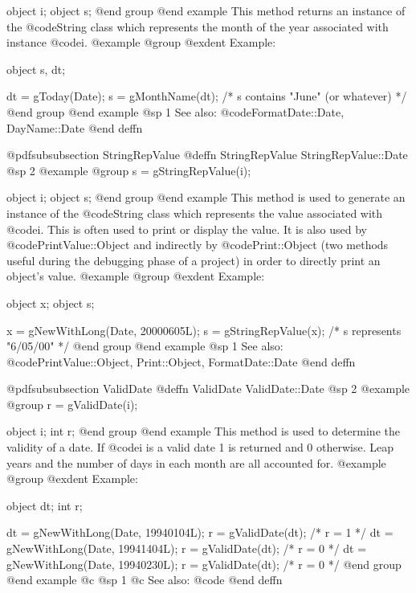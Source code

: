 object  i;
object  s;
@end group
@end example
This method returns an instance of the @code{String} class which represents
the month of the year associated with instance @code{i}.
@example
@group
@exdent Example:

object  s, dt;

dt = gToday(Date);
s = gMonthName(dt);   /*  s contains "June" (or whatever)  */
@end group
@end example
@sp 1
See also:  @code{FormatDate::Date, DayName::Date}
@end deffn










@pdfsubsubsection {StringRepValue}
@deffn {StringRepValue} StringRepValue::Date
@sp 2
@example
@group
s = gStringRepValue(i);

object  i;
object  s;
@end group
@end example
This method is used to generate an instance of the @code{String} class
which represents the value associated with @code{i}.  This is often
used to print or display the value.  It is also used by
@code{PrintValue::Object} and indirectly by @code{Print::Object}
(two methods useful during the debugging phase of a project)
in order to directly print an object's value.
@example
@group
@exdent Example:

object  x;
object  s;

x = gNewWithLong(Date, 20000605L);
s = gStringRepValue(x);      /*  s represents "6/05/00"   */
@end group
@end example
@sp 1
See also:  @code{PrintValue::Object, Print::Object, FormatDate::Date}
@end deffn










@pdfsubsubsection {ValidDate}
@deffn {ValidDate} ValidDate::Date
@sp 2
@example
@group
r = gValidDate(i);

object  i;
int     r;
@end group
@end example
This method is used to determine the validity of a date.  If @code{i}
is a valid date 1 is returned and 0 otherwise.   Leap years and the
number of days in each month are all accounted for.
@example
@group
@exdent Example:

object  dt;
int     r;

dt = gNewWithLong(Date, 19940104L);
r = gValidDate(dt);   /*  r = 1  */
dt = gNewWithLong(Date, 19941404L);
r = gValidDate(dt);   /*  r = 0  */
dt = gNewWithLong(Date, 19940230L);
r = gValidDate(dt);   /*  r = 0  */
@end group
@end example
@c @sp 1
@c See also:  @code{}
@end deffn













